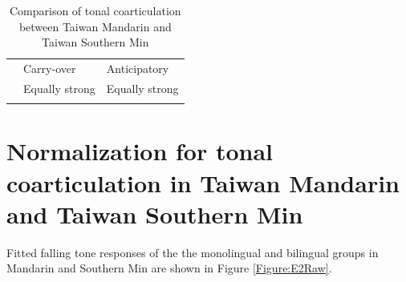 \begin{flushleft}
\begin{table}[hbt!]
\begin{tabularx}{\textwidth}{l|X|X|}
\cline{2-3}
 & Carry-over & Anticipatory \\
\hhline{~|--}\noalign{\vspace*{\doublerulesep}}
\hhline{-||--}
\multicolumn{1}{|X||}{Taiwan Mandarin} & \multirow{2}{*}{Equally strong} & \multirow{2}{*}{Equally strong}\\
\hhline{|-||~~}
\multicolumn{1}{|X||}{Taiwan Southern Min} &  & \\
\hhline{|-||-|-|}
\end{tabularx}
\caption{Comparison of tonal coarticulation between Taiwan Mandarin and Taiwan Southern Min}
\label{table:MandarinMinDistributionComparison}
\end{table}
\end{flushleft}

\section{Normalization for tonal coarticulation in Taiwan Mandarin and Taiwan Southern Min}
Fitted falling tone responses of the the monolingual and bilingual groups in Mandarin and Southern Min are shown in Figure \ref{Figure:E2Raw}.

